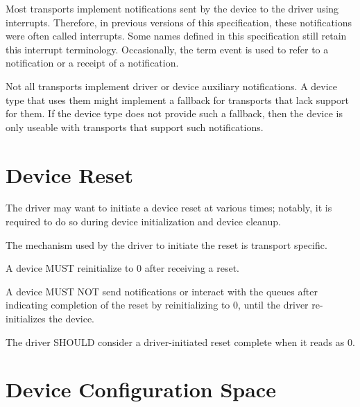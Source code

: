 Most transports implement notifications sent by the device to the
driver using interrupts. Therefore, in previous versions of this
specification, these notifications were often called interrupts.
Some names defined in this specification still retain this interrupt
terminology. Occasionally, the term event is used to refer to
a notification or a receipt of a notification.

Not all transports implement driver or device auxiliary
notifications. A device type that uses them might implement a
fallback for transports that lack support for them. If the device
type does not provide such a fallback, then the device is only
useable with transports that support such notifications.

\section{Device Reset}\label{sec:Basic Facilities of a Virtio Device / Device Reset}

The driver may want to initiate a device reset at various times; notably,
it is required to do so during device initialization and device cleanup.

The mechanism used by the driver to initiate the reset is transport specific.


A device MUST reinitialize  to 0 after receiving a reset.

A device MUST NOT send notifications or interact with the queues after
indicating completion of the reset by reinitializing 
to 0, until the driver re-initializes the device.


The driver SHOULD consider a driver-initiated reset complete when it
reads  as 0.

\section{Device Configuration Space}\label{sec:Basic Facilities of a Virtio Device / Device Configuration Space}

